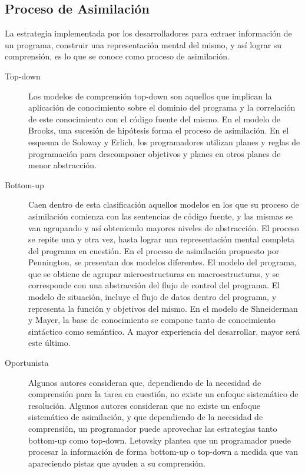 \subsection{Proceso de Asimilación}
La estrategia implementada por los desarrolladores para extraer información de un programa, 
construir una representación mental del mismo, y así lograr su comprensión, es lo que se
conoce como proceso de asimilación.

\begin{description}
    \item[Top-down] Los modelos de comprensión top-down son aquellos que implican la
    aplicación de conocimiento sobre el dominio del programa y la correlación de este
    conocimiento con el código fuente del mismo.
    En el modelo de Brooks, una sucesión de hipótesis forma el proceso de asimilación.
    En el esquema de Soloway y Erlich, los programadores utilizan planes y reglas de programación
    para descomponer objetivos y planes en otros planes de menor abstracción.
     
    \item[Bottom-up] Caen dentro de esta clasificación aquellos modelos en
    los que su proceso de asimilación comienza con las sentencias de código fuente, y
    las mismas se van agrupando y así obteniendo mayores niveles de abstracción.
    El proceso se repite una y otra vez, hasta lograr una representación mental completa
    del programa en cuestión.
    En el proceso de asimilación propuesto por Pennington, se presentan dos modelos diferentes.
    El modelo del programa, que se obtiene de agrupar microestructuras en macroestructuras, y
    se corresponde con una abstracción del flujo de control del programa.
    El modelo de situación, incluye el flujo de datos dentro del programa, y representa la
    función y objetivos del mismo.
    En el modelo de Shneiderman y Mayer, la base de conocimiento se compone tanto de
    conocimiento sintáctico como semántico.
    A mayor experiencia del desarrollar, mayor será este último.

    \item[Oportunista] Algunos autores consideran que, dependiendo
    de la necesidad de comprensión para la tarea en cuestión, no existe un enfoque
    sistemático de resolución.
    Algunos autores consideran que no existe un enfoque sistemático de asimilación,
    y que dependiendo de la necesidad de comprensión, un programador puede aprovechar
    las estrategias tanto bottom-up como top-down.
    Letovsky plantea que un programador puede procesar la información de forma bottom-up
    o top-down a medida que van apareciendo pistas que ayuden a su comprensión.
    

\end{description}
